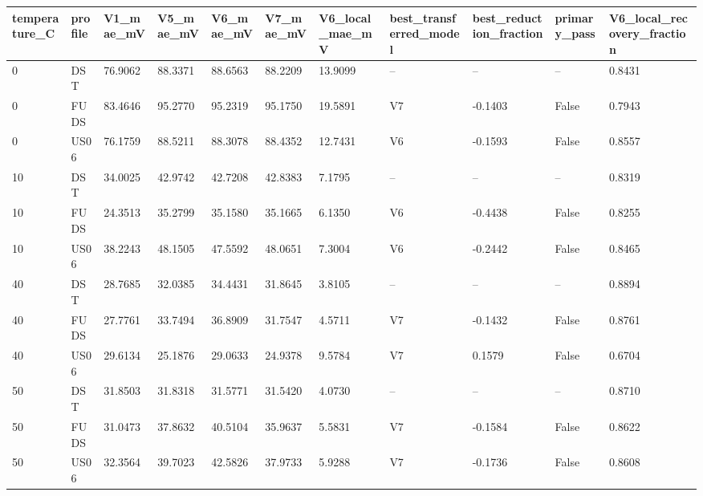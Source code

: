 \begin{tabular}{lllllllllll}
\hline
temperature\_C & profile & V1\_mae\_mV & V5\_mae\_mV & V6\_mae\_mV & V7\_mae\_mV & V6\_local\_mae\_mV & best\_transferred\_model & best\_reduction\_fraction & primary\_pass & V6\_local\_recovery\_fraction \\
\hline
0 & DST & 76.9062 & 88.3371 & 88.6563 & 88.2209 & 13.9099 & -- & -- & -- & 0.8431 \\
0 & FUDS & 83.4646 & 95.2770 & 95.2319 & 95.1750 & 19.5891 & V7 & -0.1403 & False & 0.7943 \\
0 & US06 & 76.1759 & 88.5211 & 88.3078 & 88.4352 & 12.7431 & V6 & -0.1593 & False & 0.8557 \\
10 & DST & 34.0025 & 42.9742 & 42.7208 & 42.8383 & 7.1795 & -- & -- & -- & 0.8319 \\
10 & FUDS & 24.3513 & 35.2799 & 35.1580 & 35.1665 & 6.1350 & V6 & -0.4438 & False & 0.8255 \\
10 & US06 & 38.2243 & 48.1505 & 47.5592 & 48.0651 & 7.3004 & V6 & -0.2442 & False & 0.8465 \\
40 & DST & 28.7685 & 32.0385 & 34.4431 & 31.8645 & 3.8105 & -- & -- & -- & 0.8894 \\
40 & FUDS & 27.7761 & 33.7494 & 36.8909 & 31.7547 & 4.5711 & V7 & -0.1432 & False & 0.8761 \\
40 & US06 & 29.6134 & 25.1876 & 29.0633 & 24.9378 & 9.5784 & V7 & 0.1579 & False & 0.6704 \\
50 & DST & 31.8503 & 31.8318 & 31.5771 & 31.5420 & 4.0730 & -- & -- & -- & 0.8710 \\
50 & FUDS & 31.0473 & 37.8632 & 40.5104 & 35.9637 & 5.5831 & V7 & -0.1584 & False & 0.8622 \\
50 & US06 & 32.3564 & 39.7023 & 42.5826 & 37.9733 & 5.9288 & V7 & -0.1736 & False & 0.8608 \\
\hline
\end{tabular}
